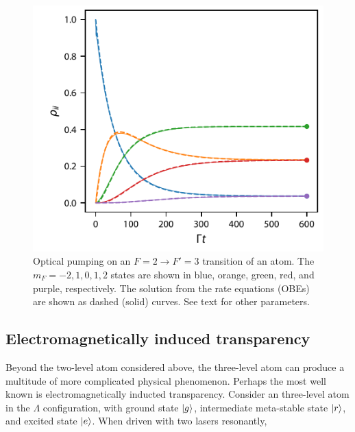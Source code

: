 \documentclass[final,5p,times,twocolumn]{elsarticle}
\begin{document}
\begin{figure}
	\center
	\includegraphics{figs/optical_pumping_f2_f3.pdf}
	\caption{\label{fig:optical_pumping} Optical pumping on an $F=2\rightarrow F'=3$ transition of an atom.  The $m_F=-2, 1, 0, 1, 2$ states are shown in blue, orange, green, red, and purple, respectively.  The solution from the rate equations (OBEs) are shown as dashed (solid) curves.  See text for other parameters.}
\end{figure}

\subsection{Electromagnetically induced transparency}
Beyond the two-level atom considered above, the three-level atom can produce a multitude of more complicated physical phenomenon.  Perhaps the most well known is electromagnetically inducted transparency.   Consider an three-level atom in the $\Lambda$ configuration, with ground state $\ket{g}$, intermediate meta-stable state $\ket{r}$, and excited state $\ket{e}$.  When driven with two lasers resonantly, 
\end{document}
